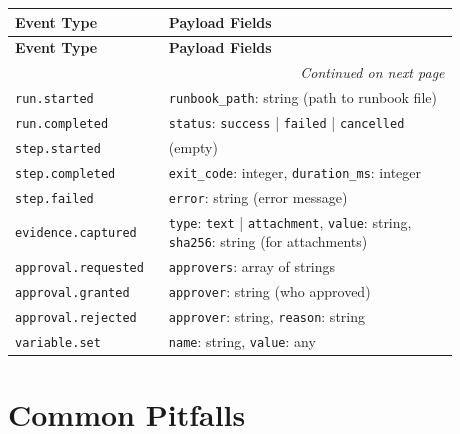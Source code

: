 \begin{longtable}{p{0.28\linewidth}p{0.60\linewidth}}
\toprule
\textbf{Event Type} & \textbf{Payload Fields} \\
\midrule
\endfirsthead

\toprule
\textbf{Event Type} & \textbf{Payload Fields} \\
\midrule
\endhead

\midrule
\multicolumn{2}{r}{\footnotesize\itshape Continued on next page} \\
\bottomrule
\endfoot

\bottomrule
\endlastfoot

\texttt{run.started} & \texttt{runbook\_path}: string (path to runbook file) \\

\texttt{run.completed} & \texttt{status}: \texttt{success} | \texttt{failed} | \texttt{cancelled} \\

\texttt{step.started} & (empty) \\

\texttt{step.completed} & \texttt{exit\_code}: integer, \texttt{duration\_ms}: integer \\

\texttt{step.failed} & \texttt{error}: string (error message) \\

\texttt{evidence.captured} & \texttt{type}: \texttt{text} | \texttt{attachment}, \texttt{value}: string, \texttt{sha256}: string (for attachments) \\

\texttt{approval.requested} & \texttt{approvers}: array of strings \\

\texttt{approval.granted} & \texttt{approver}: string (who approved) \\

\texttt{approval.rejected} & \texttt{approver}: string, \texttt{reason}: string \\

\texttt{variable.set} & \texttt{name}: string, \texttt{value}: any \\

\end{longtable}

\section{Common Pitfalls}
\label{sec:pitfalls}

